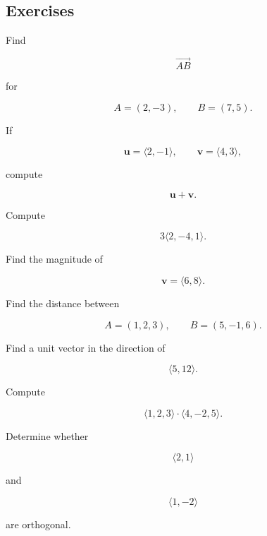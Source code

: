 \subsection{Exercises}
\label{subsec:vector-geometry-exercises}

\begin{exercise}[1]
Find

\[ \overrightarrow{AB} \]

for

\[ A=(2,-3),\qquad B=(7,5). \]
\end{exercise}

\begin{exercise}[1]
If

\[ \mathbf{u}=\langle2,-1\rangle,\qquad
\mathbf{v}=\langle4,3\rangle, \]

compute

\[ \mathbf{u}+\mathbf{v}. \]
\end{exercise}

\begin{exercise}[1]
Compute

\[ 3\langle2,-4,1\rangle. \]
\end{exercise}

\begin{exercise}[1]
Find the magnitude of

\[ \mathbf{v}=\langle6,8\rangle. \]
\end{exercise}

\begin{exercise}[1]
Find the distance between

\[ A=(1,2,3),\qquad B=(5,-1,6). \]
\end{exercise}

\begin{exercise}[2]
Find a unit vector in the direction of

\[ \langle5,12\rangle. \]
\end{exercise}

\begin{exercise}[1]
Compute

\[ \langle1,2,3\rangle\cdot\langle4,-2,5\rangle. \]
\end{exercise}

\begin{exercise}[2]
Determine whether

\[ \langle2,1\rangle \]

and

\[ \langle1,-2\rangle \]

are orthogonal.
\end{exercise}

